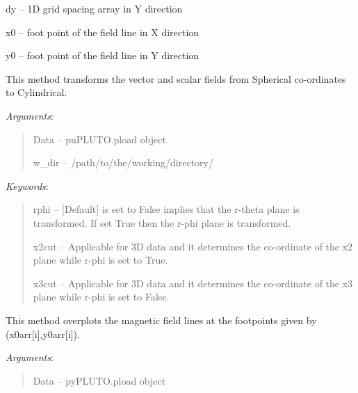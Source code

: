 \documentclass[letterpaper,10pt,english]{sphinxmanual}
\begin{document}
\begin{fulllineitems}
\begin{fulllineitems}
\begin{description}
dy -- 1D grid spacing array in Y direction

x0 -- foot point of the field line in X direction

y0 -- foot point of the field line in Y direction

\end{description}

\end{fulllineitems}


\begin{fulllineitems}
\label{image:pyPLUTO.Image.getSphData}
This method transforms the vector and scalar  fields from Spherical co-ordinates to Cylindrical.

\emph{Arguments}:
\begin{quote}

Data -- puPLUTO.pload object

w\_dir -- /path/to/the/working/directory/
\end{quote}

\emph{Keywords}:
\begin{quote}

rphi -- {[}Default{]} is set to False implies that the r-theta plane is transformed. If set True then the r-phi plane is transformed.

x2cut -- Applicable for 3D data and it determines the co-ordinate of the x2 plane while r-phi is set to True.

x3cut -- Applicable for 3D data and it determines the co-ordinate of the x3 plane while r-phi is set to False.
\end{quote}

\end{fulllineitems}


\begin{fulllineitems}
\label{image:pyPLUTO.Image.myfieldlines}
This method overplots the magnetic field lines at the footpoints given by (x0arr{[}i{]},y0arr{[}i{]}).

\emph{Arguments}:
\begin{quote}

Data -- pyPLUTO.pload object


\end{quote}
\end{fulllineitems}
\end{fulllineitems}
\end{document}
